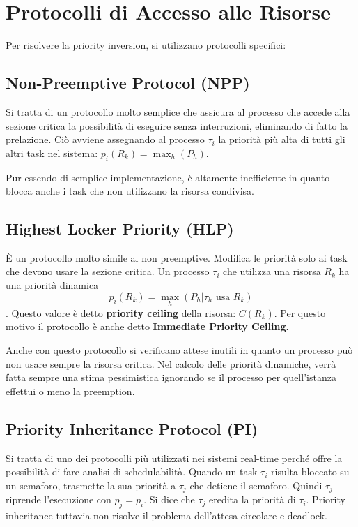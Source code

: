 \documentclass[11pt,a4paper]{report}
\begin{document}
\section{Protocolli di Accesso alle Risorse}

Per risolvere la priority inversion, si utilizzano protocolli specifici:

\subsection{Non-Preemptive Protocol (NPP)}

Si tratta di un protocollo molto semplice che assicura al processo che accede alla sezione critica la possibilità di eseguire senza interruzioni, eliminando di fatto la prelazione. Ciò avviene assegnando al processo $\tau_i$ la priorità più alta di tutti gli altri task nel sistema: $p_i(R_k) = \max_h(P_h)$.

Pur essendo di semplice implementazione, è altamente inefficiente in quanto blocca anche i task che non utilizzano la risorsa condivisa.

\subsection{Highest Locker Priority (HLP)}

È un protocollo molto simile al non preemptive. Modifica le priorità solo ai task che devono usare la sezione critica. Un processo $\tau_i$ che utilizza una risorsa $R_k$ ha una priorità dinamica \[p_i(R_k) = \max_h(P_h | \tau_h \text{ usa } R_k)\].
Questo valore è detto \textbf{priority ceiling} della risorsa: $C(R_k)$. Per questo motivo il protocollo è anche detto \textbf{Immediate Priority Ceiling}.

Anche con questo protocollo si verificano attese inutili in quanto un processo può non usare sempre la risorsa critica.
Nel calcolo delle priorità dinamiche, verrà fatta sempre una stima pessimistica ignorando se il processo per quell’istanza effettui o meno la preemption.

\subsection{Priority Inheritance Protocol (PI)}

Si tratta di uno dei protocolli più utilizzati nei sistemi real-time perché offre la possibilità di fare analisi di schedulabilità. Quando un task $\tau_i$ risulta bloccato su un semaforo, trasmette la sua priorità a $\tau_j$ che detiene il semaforo. Quindi $\tau_j$ riprende l'esecuzione con $p_j = p_i$. Si dice che $\tau_j$ eredita la priorità di $\tau_i$. Priority inheritance tuttavia non risolve il problema dell'attesa circolare e deadlock.
\end{document}
